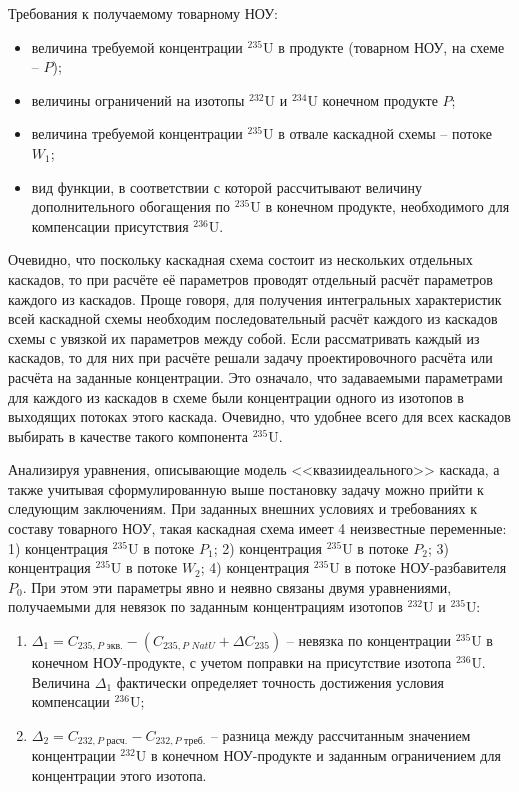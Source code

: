 Требования к получаемому товарному НОУ:

\begin{itemize}
    \item величина требуемой концентрации $^{235}$U в продукте (товарном НОУ, на схеме -- $P$);
    \item величины ограничений на изотопы $^{232}$U и $^{234}$U конечном продукте $P$;
    \item величина требуемой концентрации $^{235}$U в отвале каскадной схемы -- потоке $W_{1}$;
    \item вид функции, в соответствии с которой рассчитывают величину дополнительного обогащения по $^{235}$U в конечном продукте, необходимого для компенсации присутствия $^{236}$U.
\end{itemize}


Очевидно, что поскольку каскадная схема состоит из нескольких отдельных каскадов, то при расчёте её параметров проводят отдельный расчёт параметров каждого из каскадов. Проще говоря, для получения интегральных характеристик всей каскадной схемы необходим последовательный расчёт каждого из каскадов схемы с увязкой их параметров между собой. Если рассматривать каждый из каскадов, то для них при расчёте решали задачу проектировочного расчёта или расчёта на заданные концентрации. Это означало, что задаваемыми параметрами для каждого из каскадов в схеме были концентрации одного из изотопов в выходящих потоках этого каскада. Очевидно, что удобнее всего для всех каскадов выбирать в качестве такого компонента $^{235}$U.

Анализируя уравнения, описывающие модель <<квазиидеального>> каскада, а также учитывая сформулированную выше постановку задачу можно прийти к следующим заключениям. При заданных внешних условиях и требованиях к составу товарного НОУ, такая каскадная схема имеет 4 неизвестные переменные: 1) концентрация $^{235}$U в потоке $P_{1}$; 2) концентрация $^{235}$U в потоке $P_{2}$; 3) концентрация $^{235}$U в потоке $W_{2}$; 4) концентрация $^{235}$U в потоке НОУ-разбавителя $P_{0}$. При этом эти параметры явно и неявно связаны двумя уравнениями, получаемыми для невязок по заданным концентрациям изотопов $^{232}$U и $^{235}$U:

\begin{enumerate}
    \item $\Delta_{1}=C_{235,P\textit{ экв.}}-(C_{235,P\textit{ NatU}}+\Delta C_{235})$ -- невязка по концентрации $^{235}$U в конечном НОУ-продукте, с учетом поправки на присутствие изотопа $^{236}$U. Величина $\Delta_{1}$ фактически определяет точность достижения условия компенсации $^{236}$U;
    \item $\Delta_{2}=C_{232,P\textit{ расч.}}-C_{232,P\textit{ треб.}}$ -- разница между рассчитанным значением концентрации $^{232}$U в конечном НОУ-продукте и заданным ограничением для концентрации этого изотопа.
\end{enumerate}

